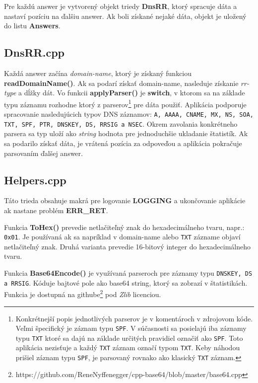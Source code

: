 \documentclass{article}
\begin{document}
        Pre každú answer je vytvorený objekt triedy \textbf{DnsRR}, ktorý spracuje dáta a nastaví pozíciu na ďalšiu answer. Ak boli získané nejaké dáta, objekt je uložený do listu
        \textbf{Answers}.

        \newpage

        \subsection{DnsRR.cpp}
        Každá answer začína \emph{domain-name}, ktorý je získaný funkciou \textbf{readDomainName()}. Ak sa podarí získať domain-name, nasleduje získanie \emph{rr-type} a dĺžky dát.
        Vo funkcii \textbf{applyParser()} je \textbf{switch}, v ktorom sa na základe typu záznamu rozhodne ktorý z parserov\footnote{Konkrétnejší popis jednotlivých parserov je v komentároch v zdrojovom kóde. 
        Veľmi špecifický je záznam typu \texttt{SPF}. V súčasnosti sa posielajú iba záznamy typu \texttt{TXT} ktoré sa dajú na základe určitých pravidiel označiť ako \texttt{SPF}. Toto aplikácia nezisťuje
        a každý \texttt{TXT} záznam označí typom \texttt{TXT}. Keby náhodou prišiel záznam typu \texttt{SPF}, je parsovaný rovnako ako klasický \texttt{TXT} záznam.} pre dáta použiť. Aplikácia podporuje
        spracovanie nasledujúcich typov DNS záznamov: \texttt{A, AAAA, CNAME, MX, NS, SOA, TXT, SPF, PTR, DNSKEY, DS, RRSIG a NSEC}. Okrem zavolania konkrétneho parsera sa typ uloží ako \emph{string}
        hodnota pre jednoduchšie ukladanie štatistík. Ak sa podarilo získať dáta, je vrátená pozícia za odpoveďou a aplikácia pokračuje parsovaním ďalšej answer.

        \subsection{Helpers.cpp}
        Táto trieda obsahuje makrá pre logovanie \textbf{LOGGING} a ukončovanie aplikácie ak nastane problém \textbf{ERR\_RET}.

        Funkcia \textbf{ToHex()} prevedie netlačiteľný znak do hexadecimálneho tvaru, napr.: \texttt{0x01}. Je používaná ak sa napríklad v domain-name alebo \texttt{TXT}
        zázname objaví netlačiteľný znak. Druhá varianta prevedie 16-bitový integer do hexadecimálneho tvaru.

        Funkcia \textbf{Base64Encode()} je využívaná parseroch pre záznamy typu \texttt{DNSKEY, DS a RRSIG}. Kóduje bajtové pole ako base64 string, ktorý sa zobrazí v štatistikách.
        Funkcia je dostupná na githube\footnote{https://github.com/ReneNyffenegger/cpp-base64/blob/master/base64.cpp} pod \emph{Zlib} licenciou. 
\end{document}
